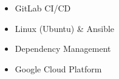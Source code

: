 \begin{itemize}
    \item GitLab CI/CD
    \item Linux (Ubuntu) \& Ansible
    \item Dependency Management
    \item Google Cloud Platform
\end{itemize}